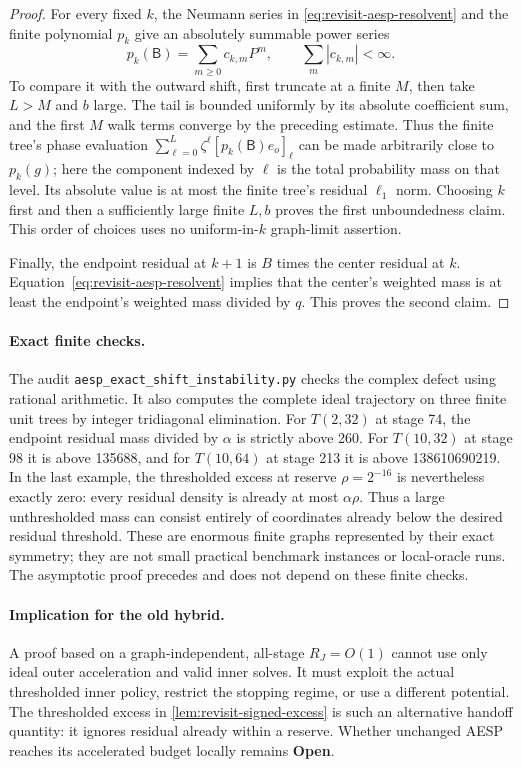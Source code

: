 \begin{proof}
For every fixed $k$, the Neumann series in
\cref{eq:revisit-aesp-resolvent} and the finite polynomial $p_k$ give
an absolutely summable power series
\[
 p_k(\mathsf B)=\sum_{m\geq0}c_{k,m}P^m,
 \qquad \sum_m|c_{k,m}|<\infty.
\]
To compare it with the outward shift, first truncate at a finite $M$,
then take $L>M$ and $b$ large. The tail is bounded uniformly by its
absolute coefficient sum, and the first $M$ walk terms converge by the
preceding estimate. Thus the finite tree's phase evaluation
$\sum_{\ell=0}^L\zeta^\ell[p_k(\mathsf B)e_o]_\ell$ can be made
arbitrarily close to $p_k(g)$; here the component indexed by $\ell$ is
the total probability mass on that level. Its absolute value is at most the finite
tree's residual $\ell_1$ norm. Choosing $k$ first and then a sufficiently
large finite $L,b$ proves the first unboundedness claim. This order of
choices uses no uniform-in-$k$ graph-limit assertion.

Finally, the endpoint residual at $k+1$ is $B$ times the center residual
at $k$. Equation~\eqref{eq:revisit-aesp-resolvent} implies that the
center's weighted mass is at least the endpoint's weighted mass divided
by $q$. This proves the second claim.
\end{proof}

\paragraph{Exact finite checks.}
The audit \texttt{aesp\_exact\_shift\_instability.py} checks the complex
defect using rational arithmetic. It also computes the complete ideal
trajectory on three finite unit trees by integer tridiagonal elimination.
For $T(2,32)$ at stage 74, the endpoint residual mass divided by $\alpha$
is strictly above 260. For $T(10,32)$ at stage 98 it is above 135688,
and for $T(10,64)$ at stage 213 it is above 138610690219.
In the last example, the thresholded excess at reserve $\rho=2^{-16}$
is nevertheless exactly zero: every residual density is already at most
$\alpha\rho$. Thus a large unthresholded mass can consist entirely of
coordinates already below the desired residual threshold.
These are enormous finite graphs represented by their exact symmetry;
they are not small practical benchmark instances or local-oracle runs.
The asymptotic proof precedes and does not depend on these finite checks.

\paragraph{Implication for the old hybrid.}
A proof based on a graph-independent, all-stage $R_J=O(1)$ cannot use
only ideal outer acceleration and valid inner solves. It must exploit
the actual thresholded inner policy, restrict the stopping regime, or
use a different potential. The thresholded excess in
\cref{lem:revisit-signed-excess} is such an alternative handoff quantity:
it ignores residual already within a reserve. Whether unchanged AESP
reaches its accelerated budget locally remains \textbf{Open}.
